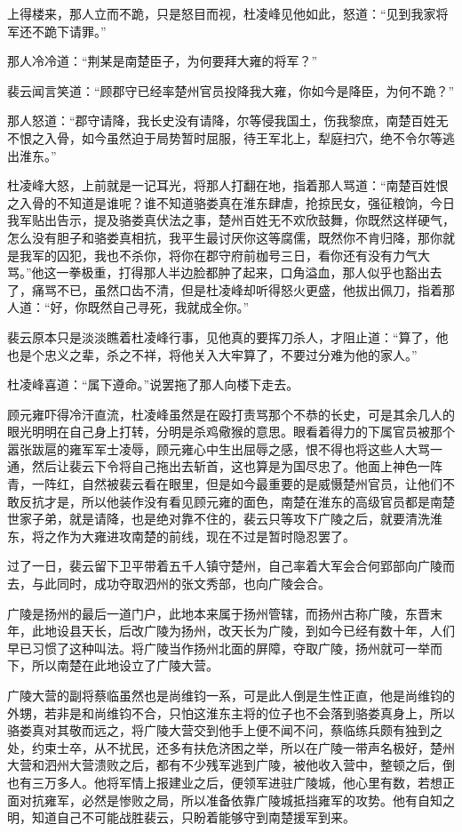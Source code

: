 上得楼来，那人立而不跪，只是怒目而视，杜凌峰见他如此，怒道：“见到我家将军还不跪下请罪。”

那人冷冷道：“荆某是南楚臣子，为何要拜大雍的将军？”

裴云闻言笑道：“顾郡守已经率楚州官员投降我大雍，你如今是降臣，为何不跪？”

那人怒道：“郡守请降，我长史没有请降，尔等侵我国土，伤我黎庶，南楚百姓无不恨之入骨，如今虽然迫于局势暂时屈服，待王军北上，犁庭扫穴，绝不令尔等逃出淮东。”

杜凌峰大怒，上前就是一记耳光，将那人打翻在地，指着那人骂道：“南楚百姓恨之入骨的不知道是谁呢？谁不知道骆娄真在淮东肆虐，抢掠民女，强征粮饷，今日我军贴出告示，提及骆娄真伏法之事，楚州百姓无不欢欣鼓舞，你既然这样硬气，怎么没有胆子和骆娄真相抗，我平生最讨厌你这等腐儒，既然你不肯归降，那你就是我军的囚犯，我也不杀你，将你在郡守府前枷号三日，看你还有没有力气大骂。”他这一拳极重，打得那人半边脸都肿了起来，口角溢血，那人似乎也豁出去了，痛骂不已，虽然口齿不清，但是杜凌峰却听得怒火更盛，他拔出佩刀，指着那人道：“好，你既然自己寻死，我就成全你。”

裴云原本只是淡淡瞧着杜凌峰行事，见他真的要挥刀杀人，才阻止道：“算了，他也是个忠义之辈，杀之不祥，将他关入大牢算了，不要过分难为他的家人。”

杜凌峰喜道：“属下遵命。”说罢拖了那人向楼下走去。

顾元雍吓得冷汗直流，杜凌峰虽然是在殴打责骂那个不恭的长史，可是其余几人的眼光明明在自己身上打转，分明是杀鸡儆猴的意思。眼看着得力的下属官员被那个嚣张跋扈的雍军军士凌辱，顾元雍心中生出屈辱之感，恨不得也将这些人大骂一通，然后让裴云下令将自己拖出去斩首，这也算是为国尽忠了。他面上神色一阵青，一阵红，自然被裴云看在眼里，但是如今最重要的是威慑楚州官员，让他们不敢反抗才是，所以他装作没有看见顾元雍的面色，南楚在淮东的高级官员都是南楚世家子弟，就是请降，也是绝对靠不住的，裴云只等攻下广陵之后，就要清洗淮东，将之作为大雍进攻南楚的前线，现在不过是暂时隐忍罢了。

过了一日，裴云留下卫平带着五千人镇守楚州，自己率着大军会合何郢部向广陵而去，与此同时，成功夺取泗州的张文秀部，也向广陵会合。

广陵是扬州的最后一道门户，此地本来属于扬州管辖，而扬州古称广陵，东晋末年，此地设县天长，后改广陵为扬州，改天长为广陵，到如今已经有数十年，人们早已习惯了这种叫法。将广陵当作扬州北面的屏障，夺取广陵，扬州就可一举而下，所以南楚在此地设立了广陵大营。

广陵大营的副将蔡临虽然也是尚维钧一系，可是此人倒是生性正直，他是尚维钧的外甥，若非是和尚维钧不合，只怕这淮东主将的位子也不会落到骆娄真身上，所以骆娄真对其敬而远之，将广陵大营交到他手上便不闻不问，蔡临练兵颇有独到之处，约束士卒，从不扰民，还多有扶危济困之举，所以在广陵一带声名极好，楚州大营和泗州大营溃败之后，都有不少残军逃到广陵，被他收入营中，整顿之后，倒也有三万多人。他将军情上报建业之后，便领军进驻广陵城，他心里有数，若想正面对抗雍军，必然是惨败之局，所以准备依靠广陵城抵挡雍军的攻势。他有自知之明，知道自己不可能战胜裴云，只盼着能够守到南楚援军到来。


